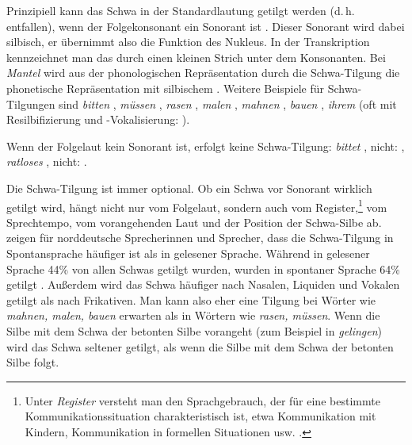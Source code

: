 Prinzipiell kann das Schwa in der Standardlautung getilgt werden (d.\,h. entfallen), wenn der Folgekonsonant ein Sonorant ist \citep[41ff]{DudenAussprache2023}. Dieser Sonorant wird dabei silbisch, er übernimmt also die Funktion des Nukleus. In der Transkription kennzeichnet man das durch einen kleinen Strich unter dem Konsonanten. Bei \textit{Mantel} wird aus der phonologischen Repräsentation  durch die Schwa-Tilgung die phonetische Repräsentation  mit silbischem \textipa{[l]}. Weitere Beispiele für Schwa-Tilgungen sind \textit{bitten} \textipa{[\textprimstress bI\.*{t}\s{n}]}, \textit{müssen} \textipa{[\textprimstress mY\.*{s}\s{n}]} , \textit{rasen} \textipa{[\textprimstress ra:.z\s{n}]}, \textit{malen} \textipa{[\textprimstress ma:.l\s{n}]}, \textit{mahnen} \textipa{[\textprimstress ma:.n\s{n}]}, \textit{bauen} , \textit{ihrem} \textipa{[\textprimstress Pi:.K\s{m}]} (oft mit Resilbifizierung und -Vokalisierung: \textipa{[Pi:5m]}).

Wenn der Folgelaut kein Sonorant ist, erfolgt keine Schwa-Tilgung: \textit{bittet} \textipa{[\textprimstress bI\.*{t}@t]}, nicht: , \textit{ratloses} \textipa{[\textprimstress Ka:t.lo.z@s]}, nicht: \textipa{[\textprimstress Ka:t.lo.zs]}.

Die Schwa-Tilgung ist immer optional. Ob ein Schwa vor Sonorant wirklich getilgt wird, hängt nicht nur vom Folgelaut, sondern auch vom Register,\footnote{Unter \textit{Register} versteht man den Sprachgebrauch, der für eine bestimmte Kommunikationssituation charakteristisch ist, etwa Kommunikation  mit Kindern, Kommunikation in formellen Situationen usw. \citep{Halliday1978}.} vom Sprechtempo, vom vorangehenden Laut und der Position der Schwa-Silbe ab. \citet[101]{KoherlRodgers2001} zeigen für norddeutsche Sprecherinnen und Sprecher, dass die Schwa-Tilgung in Spontansprache häufiger ist als in gelesener Sprache. Während in gelesener Sprache 44\% von allen Schwas getilgt wurden, wurden in spontaner Sprache 64\% getilgt \citep[104]{KoherlRodgers2001}. Außerdem wird das Schwa häufiger nach Nasalen, Liquiden und Vokalen getilgt als nach Frikativen. Man kann also eher eine Tilgung bei Wörter wie \textit{mahnen, malen, bauen} erwarten als in Wörtern wie \textit{rasen, müssen}. Wenn die Silbe mit dem Schwa der betonten Silbe vorangeht (zum Beispiel in \textit{gelingen}) wird das Schwa seltener getilgt, als wenn die Silbe mit dem Schwa der betonten Silbe folgt.


